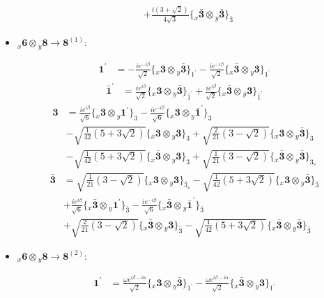 \documentclass[english]{article}
\newcommand{\rep}[1]{\mathbf{#1}}
\newcommand{\repx}[2]{{}_{#2}\mathbf{#1}}
\newcommand{\tsprodx}[2]{\repx{#1}{x}\otimes\repx{#2}{y}}
\newcommand{\subcgt}[3]{\big\{ \tsprodx{#1}{#2}\big\}^{}_{#3}}
\begin{document}
\begin{itemize}
\begin{fleqn}
\begin{align*}
 & +\frac{i \left(3+\sqrt{2}\right)}{4 \sqrt{3}}\subcgt{\bar{3}}{\bar{3}}{\bar{3}}
\end{align*}
\end{fleqn}
\item $\tsprodx{6}{8}\to\rep{8}^{(1)}$:
\begin{fleqn}
\begin{align*}
\rep{1^{\prime}} & = -\frac{i e^{-i \beta }}{\sqrt{2}}\subcgt{3}{\bar{3}}{1^{\prime}}-\frac{i e^{-i \beta }}{\sqrt{2}}\subcgt{\bar{3}}{3}{1^{\prime}}
\end{align*}
\begin{align*}
\rep{\bar{1}^{\prime}} & = \frac{i e^{i \beta }}{\sqrt{2}}\subcgt{3}{\bar{3}}{\bar{1}^{\prime}}+\frac{i e^{i \beta }}{\sqrt{2}}\subcgt{\bar{3}}{3}{\bar{1}^{\prime}}
\end{align*}
\begin{align*}
\rep{3} & = \frac{i e^{i \beta }}{\sqrt{6}}\subcgt{3}{1^{\prime}}{3}-\frac{i e^{-i \beta }}{\sqrt{6}}\subcgt{3}{\bar{1}^{\prime}}{3} \\ 
 & -\sqrt{\frac{1}{42} \left(5+3 \sqrt{2}\right)}\subcgt{3}{3}{3}+\sqrt{\frac{2}{21} \left(3-\sqrt{2}\right)}\subcgt{3}{\bar{3}}{3} \\ 
 & -\sqrt{\frac{1}{42} \left(5+3 \sqrt{2}\right)}\subcgt{\bar{3}}{3}{3}+\sqrt{\frac{1}{21} \left(3-\sqrt{2}\right)}\subcgt{\bar{3}}{\bar{3}}{3_{s}}
\end{align*}
\begin{align*}
\rep{\bar{3}} & = \sqrt{\frac{1}{21} \left(3-\sqrt{2}\right)}\subcgt{3}{3}{\bar{3}_{s}}-\sqrt{\frac{1}{42} \left(5+3 \sqrt{2}\right)}\subcgt{3}{\bar{3}}{\bar{3}} \\ 
 & +\frac{i e^{i \beta }}{\sqrt{6}}\subcgt{\bar{3}}{1^{\prime}}{\bar{3}}-\frac{i e^{-i \beta }}{\sqrt{6}}\subcgt{\bar{3}}{\bar{1}^{\prime}}{\bar{3}} \\ 
 & +\sqrt{\frac{2}{21} \left(3-\sqrt{2}\right)}\subcgt{\bar{3}}{3}{\bar{3}}-\sqrt{\frac{1}{42} \left(5+3 \sqrt{2}\right)}\subcgt{\bar{3}}{\bar{3}}{\bar{3}}
\end{align*}
\end{fleqn}
\item $\tsprodx{6}{8}\to\rep{8}^{(2)}$:
\begin{fleqn}
\begin{align*}
\rep{1^{\prime}} & = \frac{\omega  e^{i \beta -i \alpha }}{\sqrt{2}}\subcgt{3}{\bar{3}}{1^{\prime}}-\frac{\omega  e^{i \beta -i \alpha }}{\sqrt{2}}\subcgt{\bar{3}}{3}{1^{\prime}}
\end{align*}
\begin{align*}

\end{align*}
\end{fleqn}
\end{itemize}
\end{document}
